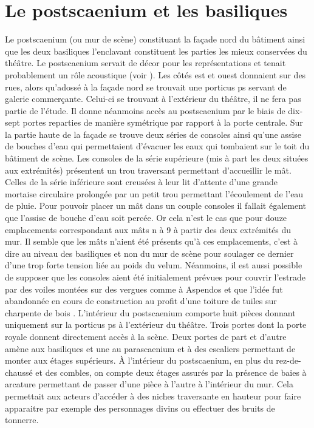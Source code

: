		\section{Le \gls{postscaenium} et les \glspl{basilique} }
		
		Le \gls{postscaenium} (ou mur de scène) constituant la façade nord du bâtiment ainsi que les deux \glspl{basilique} l'enclavant constituent les parties les mieux conservées du théâtre. Le \gls{postscaenium} servait de décor pour les représentations et tenait probablement un rôle acoustique (voir ). Les côtés est et ouest donnaient sur des rues, alors qu'adossé à la façade nord se trouvait une \gls{porticus ps} servant de galerie commerçante. Celui-ci se trouvant à l'extérieur du théâtre, il ne fera pas partie de l'étude. Il donne néanmoins accès au \gls{postscaenium} par le biais de dix-sept portes reparties de manière symétrique par rapport à la porte centrale. Sur la partie haute de la façade se trouve deux séries de \glspl{console} ainsi qu'une assise de bouches d'eau qui permettaient d'évacuer les eaux qui tombaient sur le toit du bâtiment de scène. Les \glspl{console} de la série supérieure (mis à part les deux situées aux extrémités) présentent un trou traversant permettant d'accueillir le mât. Celles de la série inférieure sont creusées à leur lit d'attente d'une grande mortaise circulaire prolongée par un petit trou permettant l'écoulement de l'eau de pluie. Pour pouvoir placer un mât dans un couple \glspl{console} il fallait également que l'assise de bouche d'eau soit percée. Or cela n'est le cas que pour douze emplacements correspondant aux mâts n à 9 à partir des deux extrémités du mur. Il semble que les mâts n'aient été présents qu'à ces emplacements, c'est à dire au niveau des \glspl{basilique} et non du mur de scène pour soulager ce dernier d'une trop forte tension liée au poids du \gls{velum}. Néanmoins, il est aussi possible de supposer que les \glspl{console} aient été initialement prévues pour couvrir l'estrade par des voiles montées sur des vergues comme à Aspendos et que l'idée fut abandonnée en cours de construction au profit d'une toiture de tuiles sur charpente de bois \cite{moretti}. L'intérieur du \gls{postscaenium} comporte huit pièces donnant uniquement sur la \gls{porticus ps} à l'extérieur du théâtre. Trois portes dont la porte royale donnent directement accès à la scène. Deux portes de part et d'autre amène aux \glspl{basilique} et une au \gls{parascaenium} et à des escaliers permettant de monter aux étages supérieurs. \`{A} l'intérieur du \gls{postscaenium}, en plus du rez-de-chaussé et des combles, on compte deux étages assurés par la présence de baies à arcature permettant de passer d'une pièce à l'autre à l'intérieur du mur. Cela permettait aux acteurs d'accéder à des niches traversante en hauteur pour faire apparaitre par exemple des personnages divins ou effectuer des bruits de tonnerre. 
		
